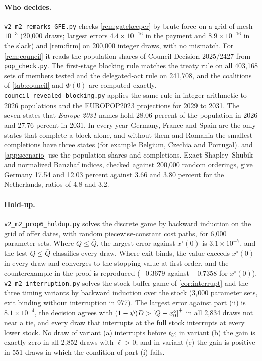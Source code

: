 \paragraph{Who decides.} \texttt{v2\_m2\_remarks\_GFE.py} checks \cref{rem:gatekeeper} by brute force on a grid of mesh $10^{-3}$ (20,000 draws; largest errors $4.4\times10^{-16}$ in the payment and $8.9\times10^{-16}$ in the slack) and \cref{rem:firm} on 200,000 integer draws, with no mismatch. For \cref{rem:council} it reads the population shares of Council Decision 2025/2427 \citep{council2025population} from \texttt{pop\_check.py}. The first-stage blocking rule matches the treaty rule on all 403,168 sets of members tested and the delegated-act rule on 241,708, and the coalitions of \cref{tab:council} and $\Phi(0)$ are computed exactly. \texttt{council\_revealed\_blocking.py} applies the same rule in integer arithmetic to 2026 populations and the EUROPOP2023 projections for 2029 to 2031. The seven states that \emph{Europe 2031} names hold 28.06 percent of the population in 2026 and 27.76 percent in 2031. In every year Germany, France and Spain are the only states that complete a block alone, and without them and Romania the smallest completions have three states (for example Belgium, Czechia and Portugal).  and \cref{app:scenario} use the population shares and completions. Exact Shapley--Shubik and normalized Banzhaf indices, checked against 200,000 random orderings, give Germany 17.54 and 12.03 percent against 3.66 and 3.80 percent for the Netherlands, ratios of 4.8 and 3.2.

\paragraph{Hold-up.} \texttt{v2\_m2\_prop6\_holdup.py} solves the discrete game by backward induction on the grid of offer dates, with random piecewise-constant cost paths, for 6,000 parameter sets. Where $Q\le\bar Q$, the largest error against $x^\circ(0)$ is $3.1\times10^{-7}$, and the test $Q\le\bar Q$ classifies every draw. Where exit binds, the value exceeds $x^\circ(0)$ in every draw and converges to the stopping value at first order, and the counterexample in the proof is reproduced ($-0.3679$ against $-0.7358$ for $x^\circ(0)$). \texttt{v2\_m2\_interruption.py} solves the stock-buffer game of \cref{cor:interrupt} and the three timing variants by backward induction over the stock (3,000 parameter sets, exit binding without interruption in 977). The largest error against part (ii) is $8.1\times10^{-4}$, the decision agrees with $(1-\psi)D>\left[Q-x^\circ_0\right]^{+}$ in all 2,834 draws not near a tie, and every draw that interrupts at the full stock interrupts at every lower stock. No draw of variant (a) interrupts before $t_U$; in variant (b) the gain is exactly zero in all 2,852 draws with $\ell>0$; and in variant (c) the gain is positive in 551 draws in which the condition of part (i) fails.
